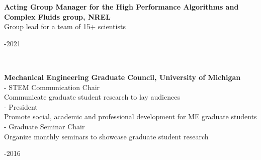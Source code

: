 \documentclass[11pt,letterpaper]{article}
\begin{document}
\begin{minipage}[t]{0.82\textwidth}%
  \textbf{Acting Group Manager for the High Performance Algorithms and Complex Fluids group, NREL}\\%
  Group lead for a team of 15+ scientists%
\end{minipage}\hfill%
\begin{minipage}[t]{0.15\textwidth}-2021%
\end{minipage}\\[2ex]%
\begin{minipage}[t]{0.82\textwidth}%
  \textbf{Mechanical Engineering Graduate Council, University of Michigan}\\%
  - STEM Communication Chair\\%
  \hphantom{-} Communicate graduate student research to lay audiences\\[1ex]%
  - President\\%
  \hphantom{-} Promote social, academic and professional development for ME graduate students\\[1ex]%
  - Graduate Seminar Chair\\%
  \hphantom{-} Organize monthly seminars to showcase graduate student research%
\end{minipage}\hfill%
\begin{minipage}[t]{0.15\textwidth}-2016%
\end{minipage}\\[2ex]%
\end{document}
